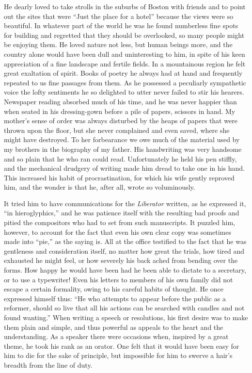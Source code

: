 \documentclass{book}
\begin{document}
He dearly loved to take strolls in the suburbs of Boston with friends and to point out the sites that were “Just the place for a hotel” because the views were so beautiful. In whatever part of the world he was he found numberless fine spots for building and regretted that they should be overlooked, so many people might be enjoying them. He loved nature not less, but human beings more, and the country alone would have been dull and uninteresting to him, in spite of his keen appreciation of a fine landscape and fertile fields. In a mountainous region he felt great exaltation of spirit. Books of poetry he always had at hand and frequently repeated to us fine passages from them. As he possessed a peculiarly sympathetic voice the lofty sentiments he so delighted to utter never failed to stir his hearers. Newspaper reading absorbed much of his time, and he was never happier than when seated in his dressing-gown before a pile of papers, scissors in hand. My mother’s sense of order was always disturbed by the heaps of papers that were thrown upon the floor, but she never complained and even saved, where she might have destroyed. To her forbearance we owe much of the material used by my brothers in the biography of my father. His handwriting was very handsome and so plain that he who ran could read. Unfortunately he held his pen stiffly, and the mechanical drudgery of writing made him dread to take one in his hand. This increased his habit of procrastination, for which his wife gently reproved him, and the wonder is that he, after all, wrote so voluminously.

It tried him to have communications for the \emph{Liberator} written, as he expressed it, “in hieroglyphics,” and he was patience itself with the resulting bad proofs and pitied the compositors who had to set from such manuscripts. It puzzled him, however, to account for the fact that even his own clear copy was sometimes made into “pie,” as the saying is. All at the office testified to the fact that he was gentleness and consideration itself, no matter how great the trials, how tired and exhausted he might feel, or how severely his back ached from bending over the forms. How happy he would have been had he been able to dictate to a secretary, or to use a typewriter! Even his letters to members of his own family did not escape a certain formality, owing to his careful habits of thought. He once expressed himself thus: “He who attempts to appear before the public as a reformer, should so live that all his actions can be searched with candles and not found wanting.” When writing a speech or resolutions, his first desire was to make them plain and simple, and thus powerful as appeals to the heart and the understanding. As a speaker there were occasions when, inspired by a great theme, he took his rank as an orator. One felt that it would have been easy for him to die for the sake of principle, but impossible for him to swerve a hair’s breadth from the line of duty.
\end{document}
